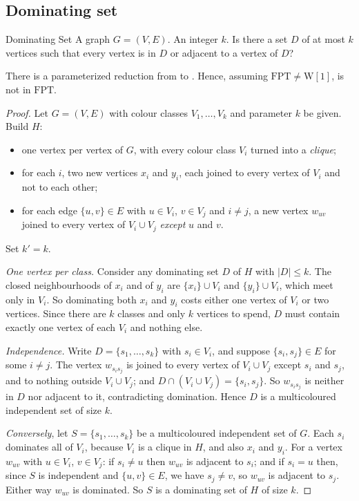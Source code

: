 \subsection{Dominating set}

\begin{probdef}{Dominating Set}
  \instance A graph $G = (V,E)$.
  \parameter An integer $k$.
  \question Is there a set $D$ of at most $k$ vertices such that every vertex
  is in $D$ or adjacent to a vertex of $D$?
\end{probdef}

\begin{theorem}\label{thm:dominating-set-w2}
There is a parameterized reduction from  to
. Hence, assuming $\mathrm{FPT} \ne \mathrm{W}[1]$,
 is not in $\mathrm{FPT}$.
\end{theorem}

\begin{proof}
Let $G = (V,E)$ with colour classes $V_1, \ldots, V_k$ and parameter $k$ be
given. Build $H$:
\begin{itemize}[leftmargin=*]
  \item one vertex per vertex of $G$, with every colour class $V_i$ turned into
        a \emph{clique};
  \item for each $i$, two new vertices $x_i$ and $y_i$, each joined to every
        vertex of $V_i$ and not to each other;
  \item for each edge $\{u,v\} \in E$ with $u \in V_i$, $v \in V_j$ and
        $i \ne j$, a new vertex $w_{uv}$ joined to every vertex of
        $V_i \cup V_j$ \emph{except} $u$ and $v$.
\end{itemize}
Set $k' = k$.

\emph{One vertex per class.} Consider any dominating set $D$ of $H$ with
$|D| \le k$. The closed neighbourhoods of $x_i$ and of $y_i$ are
$\{x_i\} \cup V_i$ and $\{y_i\} \cup V_i$, which meet only in $V_i$. So
dominating both $x_i$ and $y_i$ costs either one vertex of $V_i$ or two
vertices. Since there are $k$ classes and only $k$ vertices to spend, $D$ must
contain exactly one vertex of each $V_i$ and nothing else.

\emph{Independence.} Write $D = \{s_1, \ldots, s_k\}$ with $s_i \in V_i$, and
suppose $\{s_i, s_j\} \in E$ for some $i \ne j$. The vertex $w_{s_is_j}$ is
joined to every vertex of $V_i \cup V_j$ except $s_i$ and $s_j$, and to nothing
outside $V_i \cup V_j$; and $D \cap (V_i \cup V_j) = \{s_i,s_j\}$. So
$w_{s_is_j}$ is neither in $D$ nor adjacent to it, contradicting domination.
Hence $D$ is a multicoloured independent set of size $k$.

\emph{Conversely}, let $S = \{s_1,\ldots,s_k\}$ be a multicoloured independent
set of $G$. Each $s_i$ dominates all of $V_i$, because $V_i$ is a clique in $H$,
and also $x_i$ and $y_i$. For a vertex $w_{uv}$ with $u \in V_i$, $v \in V_j$:
if $s_i \ne u$ then $w_{uv}$ is adjacent to $s_i$; and if $s_i = u$ then, since
$S$ is independent and $\{u,v\} \in E$, we have $s_j \ne v$, so $w_{uv}$ is
adjacent to $s_j$. Either way $w_{uv}$ is dominated. So $S$ is a dominating set
of $H$ of size $k$.
\end{proof}

